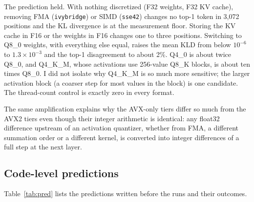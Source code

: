\begin{table}[t]
\centering\small
\caption{Divergence from the \texttt{alderlake} reference for the same model in six formats,
under two ISA changes and a thread-count change (8 chunks of 512 tokens). ``$\le10^{-6}$'' is
the storage floor of the measurement: configurations that are bitwise identical also read
$|\text{KLD}|\le10^{-6}$. F32+f32KV also stores the KV cache in F32.}
\label{tab:amp}

\end{table}

The prediction held. With nothing discretized (F32 weights, F32 KV cache), removing FMA
(\texttt{ivybridge}) or SIMD (\texttt{sse42}) changes no top-1 token in 3,072 positions and the
KL divergence is at the measurement floor. Storing the KV cache in F16 or the weights in F16
changes one to three positions. Switching to Q8\_0 weights, with everything else equal, raises
the mean KLD from below $10^{-6}$ to $1.3\times10^{-3}$ and the top-1 disagreement to about 2\%.
Q4\_0 is about twice Q8\_0, and Q4\_K\_M, whose activations use 256-value Q8\_K blocks, is about
ten times Q8\_0. I did not isolate why Q4\_K\_M is so much more sensitive; the larger activation
block (a coarser step for most values in the block) is one candidate. The thread-count control
is exactly zero in every format.

The same amplification explains why the AVX-only tiers differ so much from the AVX2 tiers even
though their integer arithmetic is identical: any float32 difference upstream of an activation
quantizer, whether from FMA, a different summation order or a different kernel, is converted
into integer differences of a full step at the next layer.

\subsection{Code-level predictions}
Table~\ref{tab:pred} lists the predictions written before the runs and their outcomes.

\begin{table}[t]
\centering\small
\caption{Pre-registered predictions (\texttt{PREDICTIONS.md}) and outcomes.}
\label{tab:pred}

\end{table}

